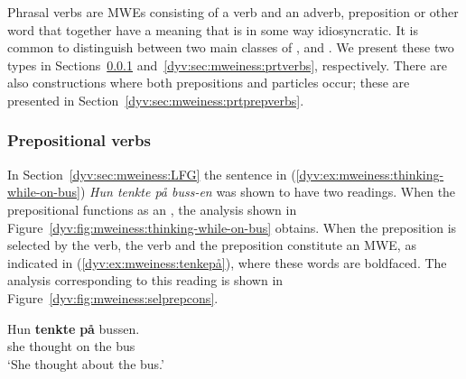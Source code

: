 \documentclass[output=paper]{langsci/langscibook}
\begin{document}
Phrasal verbs are MWEs consisting of a verb and an adverb, preposition or other word that together have a meaning that is in some way idiosyncratic.
It is common to distinguish between two main classes of ,  and .
We present these two types in Sections~\ref{dyv:sec:mweiness:prepverbs} and~\ref{dyv:sec:mweiness:prtverbs}, respectively.
There are also constructions where both prepositions and particles occur; these are presented in Section~\ref{dyv:sec:mweiness:prtprepverbs}.

\subsubsection{Prepositional verbs}\label{dyv:sec:mweiness:prepverbs}

In Section~\ref{dyv:sec:mweiness:LFG} the sentence in (\ref{dyv:ex:mweiness:thinking-while-on-bus}) \emph{Hun tenkte på buss-en} was shown to have two readings.
When the prepositional  functions as an , the analysis shown in Figure~\ref{dyv:fig:mweiness:thinking-while-on-bus} obtains.
When the preposition is selected by the verb, the verb and the preposition constitute an MWE, as indicated in (\ref{dyv:ex:mweiness:tenkepå}), where these words are boldfaced.
The analysis corresponding to this reading is shown in Figure~\ref{dyv:fig:mweiness:selprepcons}.


\ea\label{dyv:ex:mweiness:tenkepå}
\gll Hun \textbf{tenkte} \textbf{på} bussen. \\
     she thought on {the bus}\\
\glt `She thought about the bus.'
\z

\end{document}
